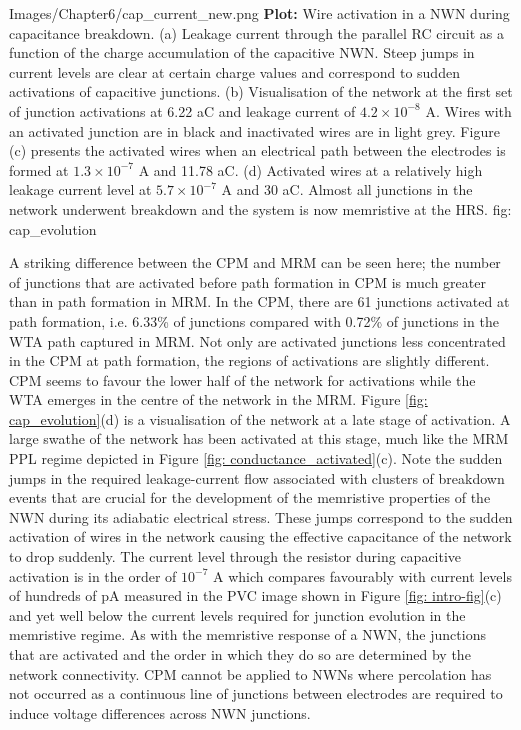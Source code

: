{Images/Chapter6/cap_current_new.png}
{\textbf{Plot:} Wire activation in a NWN during capacitance breakdown.}
{(a) Leakage current through the parallel RC circuit as a function of the charge accumulation of the capacitive NWN. Steep jumps in current levels are clear at certain charge values and correspond to sudden activations of capacitive junctions. (b) Visualisation of the network at the first set of junction activations at 6.22 aC and leakage current of $4.2\times 10^{-8}$ A. Wires with an activated junction are in black and inactivated wires are in light grey. Figure (c) presents the activated wires when an electrical path between the electrodes is formed at $1.3\times 10^{-7}$ A and 11.78 aC. (d) Activated wires at a relatively high leakage current level at $5.7\times 10^{-7}$ A and 30 aC. Almost all junctions in the network underwent breakdown and the system is now memristive at the HRS\cite{ocallaco2018}.}
{fig: cap_evolution}

A striking difference between the CPM and MRM can be seen here; the number of junctions that are activated before path formation in CPM is much greater than in path formation in MRM. In the CPM, there are 61 junctions activated at path formation, i.e. 6.33\% of junctions compared with 0.72\% of junctions in the WTA path captured in MRM. Not only are activated junctions less concentrated in the CPM at path formation, the regions of activations are slightly different. CPM seems to favour the lower half of the network for activations while the WTA emerges in the centre of the network in the MRM. Figure \ref{fig: cap_evolution}(d) is a visualisation of the network at a late stage of activation. A large swathe of the network has been activated at this stage, much like the MRM PPL regime depicted in Figure \ref{fig: conductance_activated}(c). Note the sudden jumps in the required leakage-current flow associated with clusters of breakdown events that are crucial for the development of the memristive properties of the NWN during its adiabatic electrical stress. These jumps correspond to the sudden activation of wires in the network causing the effective capacitance of the network to drop suddenly. The current level through the resistor during capacitive activation is in the order of $10^{-7}$ A which compares favourably with current levels of hundreds of pA measured in the PVC image shown in Figure \ref{fig: intro-fig}(c) and yet well below the current levels required for junction evolution in the memristive regime. As with the memristive response of a NWN, the junctions that are activated and the order in which they do so are determined by the network connectivity. CPM cannot be applied to NWNs where percolation has not occurred as a continuous line of junctions between electrodes are required to induce voltage differences across NWN junctions.

